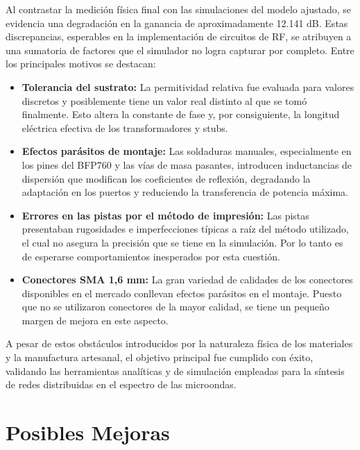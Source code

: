 \documentclass{article}
\begin{document}
Al contrastar la medición física final con las simulaciones del modelo ajustado, se evidencia una degradación en la ganancia de aproximadamente 12.141 dB. Estas discrepancias, esperables en la implementación de circuitos de RF, se atribuyen a una sumatoria de factores que el simulador no logra capturar por completo. Entre los principales motivos se destacan:

\begin{itemize}
    \item \textbf{Tolerancia del sustrato:} La permitividad relativa fue evaluada para valores discretos y posiblemente tiene un valor real distinto al que se tomó finalmente. Esto altera la constante de fase y, por consiguiente, la longitud eléctrica efectiva de los transformadores y stubs.

    \item \textbf{Efectos parásitos de montaje:} Las soldaduras manuales, especialmente en los pines del BFP760 y las vías de masa pasantes, introducen inductancias de dispersión que modifican los coeficientes de reflexión, degradando la adaptación en los puertos y reduciendo la transferencia de potencia máxima.

    \item \textbf{Errores en las pistas por el método de impresión:} Las pistas presentaban rugosidades e imperfecciones típicas a raíz del método utilizado, el cual no asegura la precisión que se tiene en la simulación. Por lo tanto es de esperarse comportamientos inesperados por esta cuestión.

    \item \textbf{Conectores SMA 1,6 mm:} La gran variedad de calidades de los conectores disponibles en el mercado conllevan efectos parásitos en el montaje. Puesto que no se utilizaron conectores de la mayor calidad, se tiene un pequeño margen de mejora en este aspecto.
    
\end{itemize}

A pesar de estos obstáculos introducidos por la naturaleza física de los materiales y la manufactura artesanal, el objetivo principal fue cumplido con éxito, validando las herramientas analíticas y de simulación empleadas para la síntesis de redes distribuidas en el espectro de las microondas.


\newpage

\section{Posibles Mejoras} \label{section:sec_5}
\end{document}
